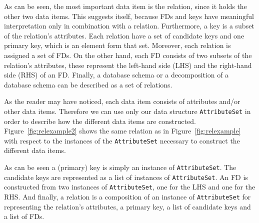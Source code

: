 As can be seen, the most important data item is the relation, since
it holds the other two data items. This suggests itself, because FDs and keys have meaningful
interpretation only in combination with a relation. Furthermore, a key is a subset of 
the relation's attributes.
Each relation have a set of candidate keys and one primary key, which is an element form that set. 
Moreover, each relation is assigned a set of FDs. On the other hand, 
each FD consists of two subsets of
the relation's attributes, these represent the left-hand side (LHS) and the 
right-hand side (RHS) of an FD. Finally, a database schema or a decomposition of
a database schema can be described as a set of relations.

As the reader may have noticed, each data item consists of attributes and/or other
data items. Therefore we can use only our data structure \verb=AttributeSet=
in order to describe how the different data items are constructed. 
Figure~\ref{fig:relexample2} shows the same relation as in Figure~\ref{fig:relexample} with
respect to the instances of the \verb=AttributeSet= necessary to construct the different
data items.


As can be seen a (primary) key is simply an instance of \verb=AttributeSet=. The candidate keys
are represented as a list of instances of \verb=AttributeSet=. An FD is constructed from
two instances of \verb=AttributeSet=, one for the LHS and one for the RHS. And finally,
a relation is a composition of an instance of  \verb=AttributeSet= for representing
the relation's attributes, a primary key, a list of candidate keys and a list of FDs. 

